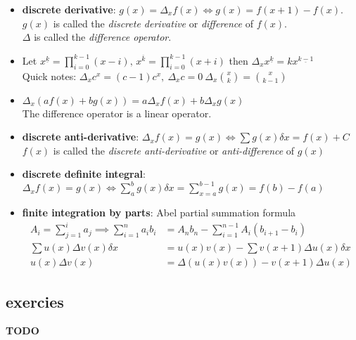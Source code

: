 \documentclass{article}
\newcommand{\blk}[1]{\left( #1 \right)}
\begin{document}
\begin{itemize}
	\item
	      \textbf{discrete derivative}: $g(x)=\Delta_x f(x)\iff g(x)=f(x+1)-f(x)$.\\
	      $g(x)$ is called the \textit{discrete derivative} or \textit{difference} of $f(x)$.\\
	      $\Delta$ is called the \textit{difference operator}.
	\item
	      Let $x^{\underline k}=\prod_{i=0}^{k-1}(x-i),\, x^{\overline k}=\prod_{i=0}^{k-1}(x+i)$
	      then $\Delta_x x^{\underline k}=k x^{\underline {k-1}}$\\
	      Quick notes: $\Delta_x c^x = (c-1)c^x,\ \Delta_x c = 0\ \Delta_x \binom{x}{k}=\binom{x}{k-1}$
	\item
	      $\Delta_x\blk{af(x)+bg(x)}=a\Delta_x f(x)+b\Delta_x g(x)$\\
	      The difference operator is a linear operator.
	\item
	      \textbf{discrete anti-derivative}: $\Delta_x f(x)=g(x)\iff \sum g(x)\delta x=f(x)+C$\\
	      $f(x)$ is called the \textit{discrete anti-derivative} or \textit{anti-difference} of $g(x)$\\
	\item
	      \textbf{discrete definite integral}: $\Delta_x f(x)=g(x) \iff \sum_{a}^b g(x)\delta x = \sum_{x=a}^{b-1} g(x)=f(b)-f(a)$
	\item
	      \textbf{finite integration by parts}: Abel partial summation formula\\
	      \[
		      \begin{aligned}
						A_i=\sum_{j=1}^{i}a_j \implies \sum_{i=1}^{n} a_i b_i
			       & = A_n b_n-\sum_{i=1}^{n-1} A_i (b_{i+1}-b_i)   \\
			      \sum u(x)\Delta v(x) \delta x
			       & =u(x)v(x)-\sum v(x+1) \Delta u(x) \delta x \\
			      u(x)\Delta v(x)
			       & = \Delta \blk{u(x)v(x)} - v(x+1)\Delta u(x)
		      \end{aligned}
	      \]
\end{itemize}

\subsection{exercies}


\textbf{TODO}
\end{document}
